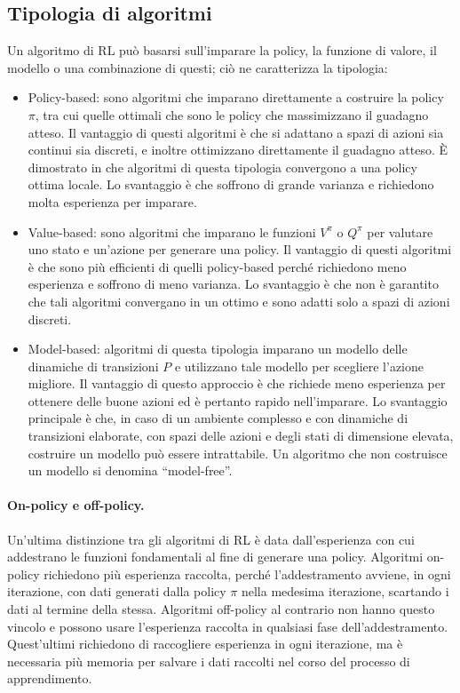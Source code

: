 \subsection{Tipologia di algoritmi}
\label{sec:2_rl_algorithms_types}

Un algoritmo di RL può basarsi sull'imparare la policy, la funzione di valore, il modello o una combinazione di questi; ciò ne caratterizza la tipologia:

\begin{itemize}
    \item Policy-based: sono algoritmi che imparano direttamente a costruire la policy $\pi$, tra cui quelle ottimali che sono le policy che massimizzano il guadagno atteso. Il vantaggio di questi algoritmi è che si adattano a spazi di azioni sia continui sia discreti, e inoltre ottimizzano direttamente il guadagno atteso. È dimostrato in \cite{Sutton2018} che algoritmi di questa tipologia convergono a una policy ottima locale. Lo svantaggio è che soffrono di grande varianza e richiedono molta esperienza per imparare.

    \item Value-based: sono algoritmi che imparano le funzioni $V^\pi$ o $Q^\pi$ per valutare uno stato e un'azione per generare una policy. Il vantaggio di questi algoritmi è che sono più efficienti di quelli policy-based perché richiedono meno esperienza e soffrono di meno varianza. Lo svantaggio è che non è garantito che tali algoritmi convergano in un ottimo e sono adatti solo a spazi di azioni discreti.

    \item Model-based: algoritmi di questa tipologia imparano un modello delle dinamiche di transizioni $P$ e utilizzano tale modello per scegliere l'azione migliore. Il vantaggio di questo approccio è che richiede meno esperienza per ottenere delle buone azioni ed è pertanto rapido nell'imparare. Lo svantaggio principale è che, in caso di un ambiente complesso e con dinamiche di transizioni elaborate, con spazi delle azioni e degli stati di dimensione elevata, costruire un modello può essere intrattabile. Un algoritmo che non costruisce un modello si denomina ``model-free''. 
\end{itemize}

\paragraph{On-policy e off-policy.} Un'ultima distinzione tra gli algoritmi di RL è data dall'esperienza con cui addestrano le funzioni fondamentali al fine di generare una policy. Algoritmi on-policy richiedono più esperienza raccolta, perché l'addestramento avviene, in ogni iterazione, con dati generati dalla policy $\pi$ nella medesima iterazione, scartando i dati al termine della stessa. Algoritmi off-policy al contrario non hanno questo vincolo e possono usare l'esperienza raccolta in qualsiasi fase dell'addestramento. Quest'ultimi richiedono di raccogliere esperienza in ogni iterazione, ma è necessaria più memoria per salvare i dati raccolti nel corso del processo di apprendimento.

